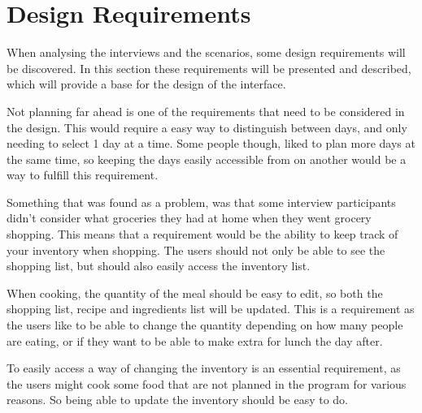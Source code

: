 \section{Design Requirements}

When analysing the interviews and the scenarios, some design requirements will be discovered. In this section these requirements will be presented and described, which will provide a base for the design of the interface.

Not planning far ahead is one of the requirements that need to be considered in the design. This would require a easy way to distinguish between days, and only needing to select 1 day at a time.
Some people though, liked to plan more days at the same time, so keeping the days easily accessible from on another would be a way to fulfill this requirement.

Something that was found as a problem, was that some interview participants didn't consider what groceries they had at home when they went grocery shopping. This means that a requirement would be the ability to keep track of your inventory when shopping. The users should not only be able to see the shopping list, but should also easily access the inventory list.

When cooking, the quantity of the meal should be easy to edit, so both the shopping list, recipe and ingredients list will be updated. This is a requirement as the users like to be able to change the quantity depending on how many people are eating, or if they want to be able to make extra for lunch the day after.

To easily access a way of changing the inventory is an essential requirement, as the users might cook some food that are not planned in the program for various reasons. So being able to update the inventory should be easy to do.

